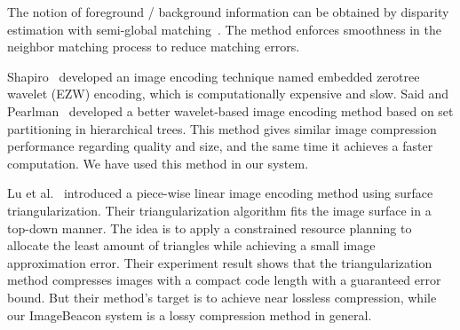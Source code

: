 The notion of foreground / background information can be obtained by disparity estimation with semi-global matching~\cite{hirschmuller2005accurate}. The method enforces  smoothness in the neighbor matching process to reduce matching errors.

Shapiro~\cite{shapiro1993embedded} developed an image encoding technique named embedded zerotree wavelet (EZW) encoding, which is computationally expensive and slow. Said and Pearlman~\cite{said1996new} developed a better wavelet-based image encoding method based on set partitioning in hierarchical trees. This method gives similar image compression performance regarding quality and size, and the same time it achieves a faster computation. We have used this method in our system.

Lu et al.~\cite{lu2000piecewise} introduced a piece-wise linear image encoding method using surface triangularization. Their triangularization algorithm fits the image surface in a top-down manner. The idea is to apply a constrained resource planning to allocate the least amount of triangles while achieving a small image approximation error. Their experiment result shows that the triangularization method compresses images with a compact code length with a guaranteed error bound. But their method's target is to achieve near lossless compression, while our ImageBeacon system is a lossy compression method in general.
